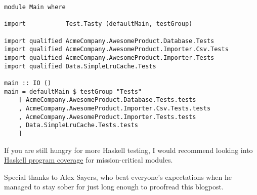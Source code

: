 \begin{verbatim}
module Main where

import           Test.Tasty (defaultMain, testGroup)

import qualified AcmeCompany.AwesomeProduct.Database.Tests
import qualified AcmeCompany.AwesomeProduct.Importer.Csv.Tests
import qualified AcmeCompany.AwesomeProduct.Importer.Tests
import qualified Data.SimpleLruCache.Tests

main :: IO ()
main = defaultMain $ testGroup "Tests"
    [ AcmeCompany.AwesomeProduct.Database.Tests.tests
    , AcmeCompany.AwesomeProduct.Importer.Csv.Tests.tests
    , AcmeCompany.AwesomeProduct.Importer.Tests.tests
    , Data.SimpleLruCache.Tests.tests
    ]
\end{verbatim}
If you are still hungry for more Haskell testing, I would recommend looking into \href{http://wiki.haskell.org/Haskell_program_coverage}{Haskell program coverage} for mission-critical modules.

Special thanks to Alex Sayers, who beat everyone's expectations when he managed to stay sober for just long enough to proofread this blogpost.
